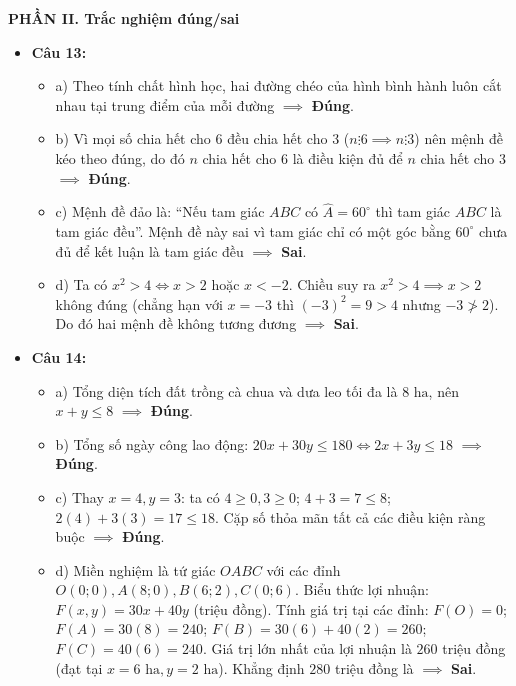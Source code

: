 \documentclass[12pt,a4paper]{article}
\begin{document}
\vspace{0.1cm}
\textbf{PHẦN II. Trắc nghiệm đúng/sai}
\begin{itemize}[leftmargin=0.6cm, itemsep=1.5pt, topsep=1pt]
    \item \textbf{Câu 13:}
    \begin{itemize}[itemsep=0.5pt]
        \item a) Theo tính chất hình học, hai đường chéo của hình bình hành luôn cắt nhau tại trung điểm của mỗi đường $\implies$ \textbf{Đúng}.
        \item b) Vì mọi số chia hết cho $6$ đều chia hết cho $3$ ($n \vdots 6 \implies n \vdots 3$) nên mệnh đề kéo theo đúng, do đó $n$ chia hết cho $6$ là điều kiện đủ để $n$ chia hết cho $3$ $\implies$ \textbf{Đúng}.
        \item c) Mệnh đề đảo là: ``Nếu tam giác $ABC$ có $\widehat{A} = 60^\circ$ thì tam giác $ABC$ là tam giác đều''. Mệnh đề này sai vì tam giác chỉ có một góc bằng $60^\circ$ chưa đủ để kết luận là tam giác đều $\implies$ \textbf{Sai}.
        \item d) Ta có $x^2 > 4 \iff x > 2$ hoặc $x < -2$. Chiều suy ra $x^2 > 4 \implies x > 2$ không đúng (chẳng hạn với $x = -3$ thì $(-3)^2 = 9 > 4$ nhưng $-3 \ngtr 2$). Do đó hai mệnh đề không tương đương $\implies$ \textbf{Sai}.
    \end{itemize}

    \item \textbf{Câu 14:}
    \begin{itemize}[itemsep=0.5pt]
        \item a) Tổng diện tích đất trồng cà chua và dưa leo tối đa là $8\text{ ha}$, nên $x + y \le 8$ $\implies$ \textbf{Đúng}.
        \item b) Tổng số ngày công lao động: $20x + 30y \le 180 \iff 2x + 3y \le 18$ $\implies$ \textbf{Đúng}.
        \item c) Thay $x = 4, y = 3$: ta có $4 \ge 0, 3 \ge 0$; $4 + 3 = 7 \le 8$; $2(4) + 3(3) = 17 \le 18$. Cặp số thỏa mãn tất cả các điều kiện ràng buộc $\implies$ \textbf{Đúng}.
        \item d) Miền nghiệm là tứ giác $OABC$ với các đỉnh $O(0; 0), A(8; 0), B(6; 2), C(0; 6)$.
        Biểu thức lợi nhuận: $F(x, y) = 30x + 40y$ (triệu đồng).
        Tính giá trị tại các đỉnh: $F(O) = 0$; $F(A) = 30(8) = 240$; $F(B) = 30(6) + 40(2) = 260$; $F(C) = 40(6) = 240$.
        Giá trị lớn nhất của lợi nhuận là $260$ triệu đồng (đạt tại $x = 6\text{ ha}, y = 2\text{ ha}$). Khẳng định $280$ triệu đồng là $\implies$ \textbf{Sai}.
    \end{itemize}
\end{itemize}
\end{document}
